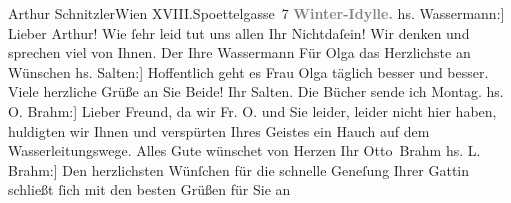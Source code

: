                   Arthur Schnitzler\pend{}\pstart{}Wien XVIII.\pend{}\pstart{}Spoettelgasse 7\pend{}{\bigskip}
\pstart
           \noindent{}\centering{}{\pb}\textcolor{gray}{\textbf{Winter-Idylle.}}\pend
           \vspace{1em}
\pstart
           \noindent{}{\pb}{[}hs. Wassermann:{]} Lieber Arthur! Wie{ }ſehr leid tut uns allen Ihr Nichtdaſein! Wir
               denken und sprechen viel von Ihnen.\pend
           \pstart Der Ihre \spacefill\mbox{Wassermann}\pend{}
\pstart
           \introOben{}Für Olga das Herzlichste an
                  Wünschen\introOben{}\pend
           \vspace{1em}
\pstart
           \noindent{}{[}hs. Salten:{]} Hoffentlich geht es Frau Olga täglich besser und besser. Viele herzliche Grüße an Sie
               Beide!\pend
           \pstart Ihr \spacefill\mbox{Salten.}\pend{}
\pstart
           \noindent{}Die Bücher sende ich Montag.\pend
           \vspace{1em}
\pstart
           \noindent{}{[}hs. O. Brahm:{]} Lieber Freund, da wir Fr. O.
               und Sie leider, leider nicht hier haben, huldigten wir Ihnen und verspürten Ihres
               Geistes ein Hauch auf dem Wasserleitungswege. Alles Gute wünschet von Herzen\pend
           \pstart Ihr \spacefill\mbox{Otto Brahm}\pend{}\vspace{1em}
\pstart
           \noindent{}{[}hs. L. Brahm:{]} Den herzlichsten Wünſchen für die schnelle Geneſung
               Ihrer Gattin schließt{ }ſich mit den besten
               Grüßen für Sie an\pend
           
